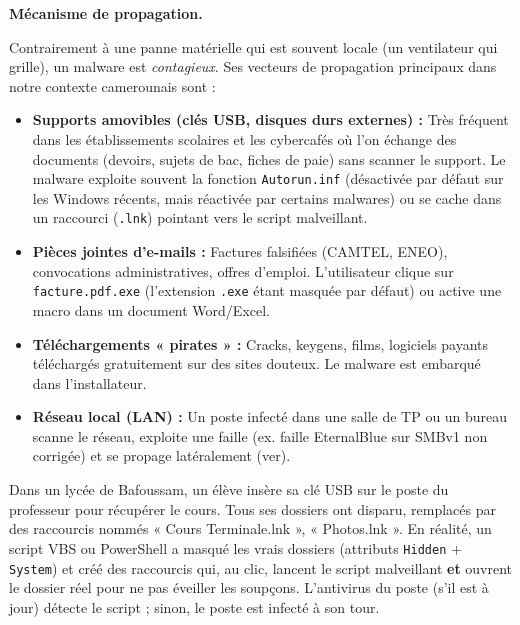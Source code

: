 \documentclass[11pt]{article}
\begin{document}
\textbf{Mécanisme de propagation.}\par
Contrairement à une panne matérielle qui est souvent locale (un ventilateur qui grille), un malware est \emph{contagieux}. Ses vecteurs de propagation principaux dans notre contexte camerounais sont :
\begin{itemize}
    \item \textbf{Supports amovibles (clés USB, disques durs externes) :} Très fréquent dans les établissements scolaires et les cybercafés où l'on échange des documents (devoirs, sujets de bac, fiches de paie) sans scanner le support. Le malware exploite souvent la fonction \texttt{Autorun.inf} (désactivée par défaut sur les Windows récents, mais réactivée par certains malwares) ou se cache dans un raccourci (\texttt{.lnk}) pointant vers le script malveillant.
    \item \textbf{Pièces jointes d'e-mails :} Factures falsifiées (CAMTEL, ENEO), convocations administratives, offres d'emploi. L'utilisateur clique sur \texttt{facture.pdf.exe} (l'extension \texttt{.exe} étant masquée par défaut) ou active une macro dans un document Word/Excel.
    \item \textbf{Téléchargements « pirates » :} Cracks, keygens, films, logiciels payants téléchargés gratuitement sur des sites douteux. Le malware est embarqué dans l'installateur.
    \item \textbf{Réseau local (LAN) :} Un poste infecté dans une salle de TP ou un bureau scanne le réseau, exploite une faille (ex. faille EternalBlue sur SMBv1 non corrigée) et se propage latéralement (ver).
\end{itemize}

\begin{exemplebox}
Dans un lycée de Bafoussam, un élève insère sa clé USB sur le poste du professeur pour récupérer le cours. Tous ses dossiers ont disparu, remplacés par des raccourcis nommés « Cours Terminale.lnk », « Photos.lnk ». En réalité, un script VBS ou PowerShell a masqué les vrais dossiers (attributs \texttt{Hidden} + \texttt{System}) et créé des raccourcis qui, au clic, lancent le script malveillant \textbf{et} ouvrent le dossier réel pour ne pas éveiller les soupçons. L'antivirus du poste (s'il est à jour) détecte le script ; sinon, le poste est infecté à son tour.
\end{exemplebox}
\end{document}
